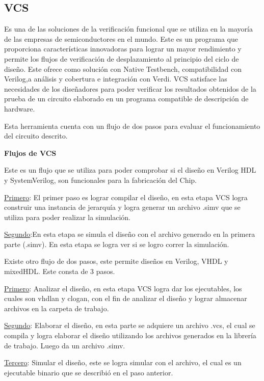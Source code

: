 \subsection*{VCS}

Es una de las soluciones de la verificación funcional que se utiliza en la mayoría de las empresas de semiconductores en el mundo. Este es un programa que proporciona características innovadoras para lograr un mayor rendimiento y permite los flujos de verificación de desplazamiento al principio del ciclo de diseño.
Este ofrece como solución con Native Testbench, compatibilidad con Verilog,a análisis y cobertura e integración con Verdi. VCS satisface las necesidades de los diseñadores para poder verificar los resultados obtenidos de la prueba de un circuito elaborado en un  programa compatible de descripción de hardware.

Esta herramienta cuenta con un flujo de dos pasos para evaluar el funcionamiento del circuito descrito.
 \cite{VCS} 

 
  \textbf{Flujos de VCS}  
  
  
  Este es un flujo que se utiliza para poder comprobar si el diseño en Verilog HDL y SystemVerilog, son funcionales para la fabricación del Chip.
  
  \underline{Primero}:  El primer paso es lograr compilar el diseño, en esta etapa VCS logra construir una instancia de jerarquía y logra generar un archivo .simv que se utiliza para poder realizar la simulación.
  
  \underline{Segundo}:En esta etapa se simula el diseño con el archivo generado en la primera parte (.simv). En esta etapa  se logra ver si se logro correr la simulación.
  
  Existe otro flujo de dos pasos, este permite diseños en Verilog, VHDL y mixedHDL. Este consta de 3 pasos.
  
  \underline{Primero}:  Analizar el diseño, en esta etapa VCS logra dar los ejecutables, los cuales son vhdlan y clogan, con el fin de analizar el diseño y lograr almacenar archivos en la carpeta de trabajo.
  
  \underline{Segundo}: Elaborar el diseño, en esta parte se adquiere un archivo .vcs, el cual se compila y logra elaborar el diseño utilizando los archivos generados en la librería de trabajo. Luego da un archivo .simv.
  
  \underline{Tercero}: Simular el diseño, este se logra simular con el archivo, el cual es un ejecutable binario que se describió en el paso anterior. 
 \cite{Jeff} 
  

